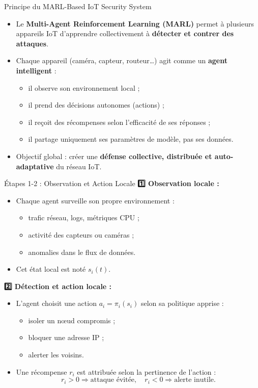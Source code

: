 \documentclass{beamer}
\begin{document}
\begin{frame}{Principe du MARL-Based IoT Security System}
\begin{itemize}
    \item Le \textbf{Multi-Agent Reinforcement Learning (MARL)} permet à plusieurs appareils IoT d’apprendre collectivement à \textbf{détecter et contrer des attaques}.
    \item Chaque appareil (caméra, capteur, routeur…) agit comme un \textbf{agent intelligent} :
    \begin{itemize}
        \item il observe son environnement local ;
        \item il prend des décisions autonomes (actions) ;
        \item il reçoit des récompenses selon l’efficacité de ses réponses ;
        \item il partage uniquement ses paramètres de modèle, pas ses données.
    \end{itemize}
    \item Objectif global : créer une \textbf{défense collective, distribuée et auto-adaptative} du réseau IoT.
\end{itemize}
\end{frame}

\begin{frame}{Étapes 1-2 : Observation et Action Locale}
\textbf{1️⃣ Observation locale :}
\begin{itemize}
    \item Chaque agent surveille son propre environnement :
    \begin{itemize}
        \item trafic réseau, logs, métriques CPU ;
        \item activité des capteurs ou caméras ;
        \item anomalies dans le flux de données.
    \end{itemize}
    \item Cet état local est noté $s_i(t)$.
\end{itemize}

\vspace{0.3cm}
\textbf{2️⃣ Détection et action locale :}
\begin{itemize}
    \item L’agent choisit une action $a_i = \pi_i(s_i)$ selon sa politique apprise :
    \begin{itemize}
        \item isoler un nœud compromis ;
        \item bloquer une adresse IP ;
        \item alerter les voisins.
    \end{itemize}
    \item Une récompense $r_i$ est attribuée selon la pertinence de l’action :
    \[
    r_i > 0 \Rightarrow \text{attaque évitée}, \quad r_i < 0 \Rightarrow \text{alerte inutile.}
    \]
\end{itemize}
\end{frame}
\end{document}
